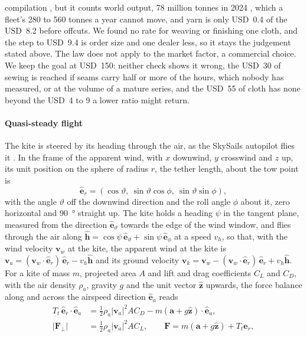 compilation , but it counts world output, 78 million tonnes in 2024 , which a fleet's 280 to 560 tonnes a year cannot move, and yarn is only USD~0.4 of the USD~8.2 before offcuts. We found no rate for weaving or finishing one cloth, and the step to USD~9.4 is order size and one dealer less, so it stays the judgement stated above. The law does not apply to the market factor, a commercial choice. We keep the goal at USD~150: neither check shows it wrong, the USD~30 of sewing is reached if seams carry half or more of the hours, which nobody has measured, or at the volume of a mature series, and the USD~55 of cloth has none beyond the USD~4 to 9 a lower ratio might return.

\paragraph{Quasi-steady flight} The kite is steered by its heading through the air, as the SkySails autopilot flies it \citep{erhard2013}. In the frame of the apparent wind, with $x$ downwind, $y$ crosswind and $z$ up, its unit position on the sphere of radius $r$, the tether length, about the tow point is
\begin{equation}
\hat{\mathbf e}_r = (\cos\vartheta,\ \sin\vartheta\cos\phi,\ \sin\vartheta\sin\phi),
\end{equation}
with the angle $\vartheta$ off the downwind direction and the roll angle $\phi$ about it, zero horizontal and \SI{90}{\degree} straight up. The kite holds a heading $\psi$ in the tangent plane, measured from the direction $\hat{\mathbf e}_\vartheta$ towards the edge of the wind window, and flies through the air along $\hat{\mathbf h} = \cos\psi\,\hat{\mathbf e}_\vartheta + \sin\psi\,\hat{\mathbf e}_\phi$ at a speed $v_h$, so that, with the wind velocity $\mathbf v_w$ at the kite, the apparent wind at the kite is $\mathbf v_a = (\mathbf v_w\cdot\hat{\mathbf e}_r)\,\hat{\mathbf e}_r - v_h\hat{\mathbf h}$ and its ground velocity $\mathbf v_k = \mathbf v_w - (\mathbf v_w\cdot\hat{\mathbf e}_r)\,\hat{\mathbf e}_r + v_h\hat{\mathbf h}$. For a kite of mass $m$, projected area $A$ and lift and drag coefficients $C_L$ and $C_D$, with the air density $\rho_a$, gravity $g$ and the unit vector $\hat{\mathbf z}$ upwards, the force balance along and across the airspeed direction $\hat{\mathbf e}_a$ reads
\begin{align}
T_t\,\hat{\mathbf e}_r\cdot\hat{\mathbf e}_a &= \tfrac12\rho_a|\mathbf v_a|^2 A C_D - m(\mathbf a + g\hat{\mathbf z})\cdot\hat{\mathbf e}_a, \label{eq:kite_drag}\\
\left|\mathbf F_\perp\right| &= \tfrac12\rho_a|\mathbf v_a|^2 A C_L, \qquad \mathbf F = m(\mathbf a + g\hat{\mathbf z}) + T_t\hat{\mathbf e}_r, \label{eq:kite_lift}
\end{align}
